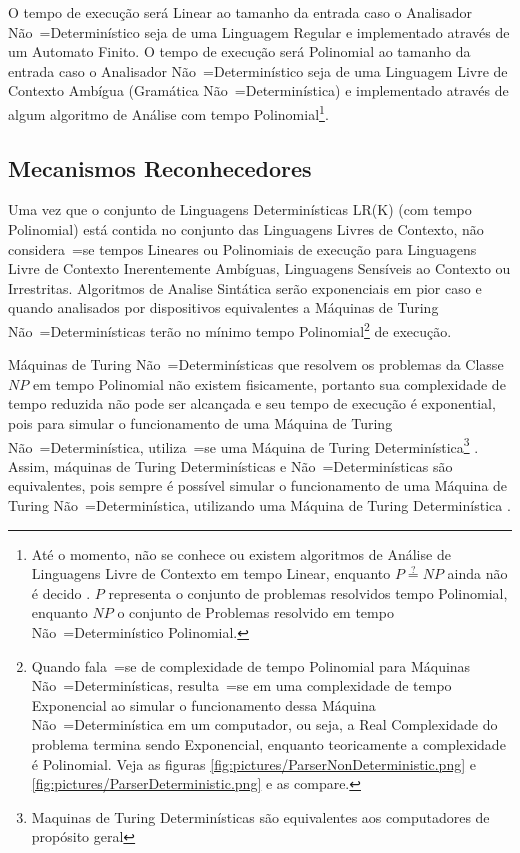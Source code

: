 {    O tempo de execução será Linear ao tamanho da entrada caso o Analisador Não~=Determinístico seja de uma Linguagem Regular e
    implementado através de um Automato Finito.
    O tempo de execução será Polinomial ao tamanho da entrada caso o Analisador Não~=Determinístico seja de uma Linguagem Livre de Contexto Ambígua (Gramática Não~=Determinística) e
    implementado através de algum algoritmo de Análise com tempo Polinomial\footnote{
    Até o momento,
    não se conhece ou
    existem algoritmos de Análise de Linguagens Livre de Contexto em tempo Linear,
    enquanto $P \stackrel{?}{=} NP$ ainda não é decido \cite{computationalComplexityAuroraBarak}.
    $P$ representa o conjunto de problemas resolvidos tempo Polinomial,
    enquanto $NP$ o conjunto de Problemas resolvido em tempo Não~=Determinístico Polinomial.
    }.


\subsection{Mecanismos Reconhecedores}

    Uma vez que o conjunto de Linguagens Determinísticas LR(K) (com tempo Polinomial) está contida no conjunto das Linguagens Livres de Contexto,
    não considera~=se tempos Lineares ou
    Polinomiais de execução para Linguagens Livre de Contexto Inerentemente Ambíguas,
    Linguagens Sensíveis ao Contexto ou
    Irrestritas.
    Algoritmos de Analise Sintática serão exponenciais em pior caso \cite{contextSensitiveParsing} e
    quando analisados por dispositivos equivalentes a Máquinas de Turing Não~=Determinísticas terão no mínimo tempo Polinomial\footnote{
    Quando fala~=se de complexidade de tempo Polinomial para Máquinas Não~=Determinísticas,
    resulta~=se em uma complexidade de tempo Exponencial ao simular o funcionamento dessa Máquina Não~=Determinística em um computador,
    ou seja,
    a Real Complexidade do problema termina sendo Exponencial,
    enquanto teoricamente a complexidade é Polinomial.
    Veja as figuras \ref{fig:pictures/ParserNonDeterministic.png} e
    \ref{fig:pictures/ParserDeterministic.png} e
    as compare.
    }
    de execução.

    Máquinas de Turing Não~=Determinísticas que resolvem os problemas da Classe $NP$ em tempo Polinomial não existem fisicamente,
    portanto sua complexidade de tempo reduzida não pode ser alcançada e
    seu tempo de execução é exponential,
    pois para simular o funcionamento de uma Máquina de Turing Não~=Determinística,
    utiliza~=se uma Máquina de Turing Determinística\footnote{
    Maquinas de Turing Determinísticas são equivalentes aos computadores de propósito geral
    }
    \cite{sipserBook,turingMachinesRoyer}.
    Assim,
    máquinas de Turing Determinísticas e
    Não~=Determinísticas são equivalentes,
    pois sempre é possível simular o funcionamento de uma Máquina de Turing Não~=Determinística,
    utilizando uma Máquina de Turing Determinística \cite{hopcroftBook}.

}
